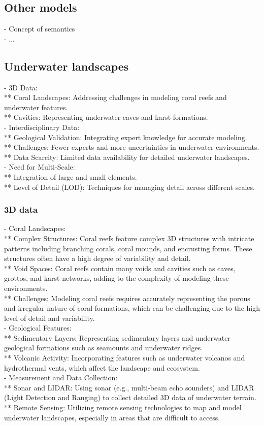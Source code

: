 \subsection{Other models}
- Concept of semantics \\
- ...

\subsection{Underwater landscapes}
- 3D Data: \\
** Coral Landscapes: Addressing challenges in modeling coral reefs and underwater features. \\
** Cavities: Representing underwater caves and karst formations. \\
- Interdisciplinary Data: \\
** Geological Validation: Integrating expert knowledge for accurate modeling. \\
** Challenges: Fewer experts and more uncertainties in underwater environments. \\
** Data Scarcity: Limited data availability for detailed underwater landscapes. \\
- Need for Multi-Scale: \\
** Integration of large and small elements. \\
** Level of Detail (LOD): Techniques for managing detail across different scales.

\subsubsection{3D data}
- Coral Landscapes: \\
** Complex Structures: Coral reefs feature complex 3D structures with intricate patterns including branching corals, coral mounds, and encrusting forms. These structures often have a high degree of variability and detail. \\
** Void Spaces: Coral reefs contain many voids and cavities such as caves, grottos, and karst networks, adding to the complexity of modeling these environments. \\
** Challenges: Modeling coral reefs requires accurately representing the porous and irregular nature of coral formations, which can be challenging due to the high level of detail and variability. \\
- Geological Features: \\
** Sedimentary Layers: Representing sedimentary layers and underwater geological formations such as seamounts and underwater ridges. \\
** Volcanic Activity: Incorporating features such as underwater volcanos and hydrothermal vents, which affect the landscape and ecosystem. \\
- Measurement and Data Collection: \\
** Sonar and LIDAR: Using sonar (e.g., multi-beam echo sounders) and LIDAR (Light Detection and Ranging) to collect detailed 3D data of underwater terrain. \\
** Remote Sensing: Utilizing remote sensing technologies to map and model underwater landscapes, especially in areas that are difficult to access.

